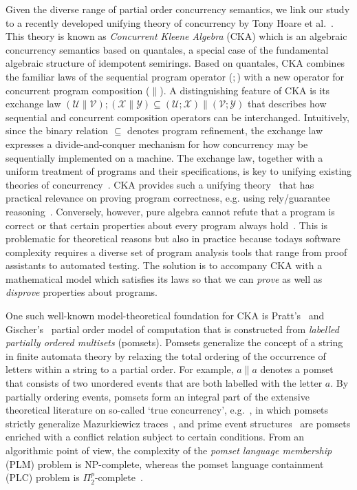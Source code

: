 \documentclass{llncs}
\newcommand{\cU}{\mathcal{U}}
\newcommand{\cV}{\mathcal{V}}
\newcommand{\cX}{\mathcal{X}}
\newcommand{\cY}{\mathcal{Y}}
\begin{document}
Given the diverse range of partial order concurrency semantics, we link our study to a recently developed unifying theory of concurrency by Tony Hoare et al.~\cite{HMSW2011}. This theory is known as \emph{Concurrent Kleene Algebra} (CKA) which is an algebraic concurrency semantics based on quantales, a special case of the fundamental algebraic structure of idempotent semirings. Based on quantales, CKA combines the familiar laws of the sequential program operator ($;$) with a new operator for concurrent program composition ($\parallel$). A distinguishing feature of CKA is its exchange law $(\cU \parallel \cV) ; (\cX \parallel \cY) \subseteq (\cU ; \cX) \parallel (\cV ; \cY)$ that describes how sequential and concurrent composition operators can be interchanged. Intuitively, since the binary relation $\subseteq$ denotes program refinement, the exchange law expresses a divide-and-conquer mechanism for how concurrency may be sequentially implemented on a machine. The exchange law, together with a uniform treatment of programs and their specifications, is key to unifying existing theories of concurrency~\cite{HvS2014}. CKA provides such a unifying theory~\cite{HvS2012,HvS2014} that has practical relevance on proving program correctness, e.g. using rely/guarantee reasoning~\cite{HMSW2011}. Conversely, however, pure algebra cannot refute that a program is correct or that certain properties about every program always hold~\cite{HvS2012,HvS2014,HvSMSVZOH2014}. This is problematic for theoretical reasons but also in practice because todays software complexity requires a diverse set of program analysis tools that range from proof assistants to automated testing. The solution is to accompany CKA with a mathematical model which satisfies its laws so that we can \emph{prove} as well as \emph{disprove} properties about programs.

One such well-known model-theoretical foundation for CKA is Pratt's~\cite{P1986} and Gischer's~\cite{G1988} partial order model of computation that is constructed from \emph{labelled partially ordered multisets} (pomsets). Pomsets generalize the concept of a string in finite automata theory by relaxing the total ordering of the occurrence of letters within a string to a partial order. For example, $a \parallel a$ denotes a pomset that consists of two unordered events that are both labelled with the letter $a$. By partially ordering events, pomsets form an integral part of the extensive theoretical literature on so-called `true concurrency', e.g.~\cite{P1966,L1978,G1981,NPW1981,P1986,G1988}, in which pomsets strictly generalize Mazurkiewicz traces~\cite{BK1992}, and prime event structures~\cite{NPW1981} are pomsets enriched with a conflict relation subject to certain conditions. From an algorithmic point of view, the complexity of the \emph{pomset language membership} (PLM) problem is NP-complete, whereas the pomset language containment (PLC) problem is $\Pi_2^p$-complete~\cite{FKL1993}.
\end{document}
